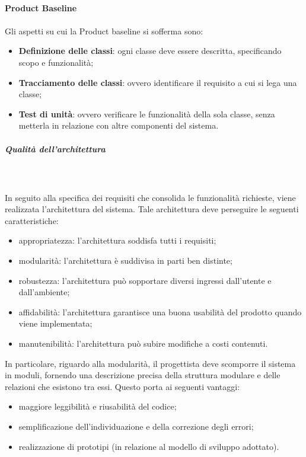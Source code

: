 			\mbox{} \\
			\textbf{Product Baseline} \mbox{} \\ \mbox{} \\
			Gli aspetti su cui la  Product baseline si sofferma sono:
				\begin{itemize}
					\item \textbf{Definizione delle classi}: ogni classe deve essere descritta, specificando scopo e funzionalità;
					\item \textbf{Tracciamento delle classi}: ovvero identificare il requisito a cui si lega una classe;
					\item \textbf{Test di unità}: ovvero verificare le funzionalità della sola classe, senza metterla in relazione con altre componenti del sistema.
				\end{itemize}
				\subparagraph{Qualità dell'architettura} \mbox{} \\ \mbox{} \\
				In seguito alla specifica dei requisiti che consolida le funzionalità richieste, viene realizzata l'architettura del sistema. Tale architettura deve perseguire le seguenti caratteristiche: \begin{itemize}
				\item appropriatezza: l'architettura soddisfa tutti i requisiti;
				\item modularità: l'architettura è suddivisa in parti ben distinte;
				\item robustezza: l'architettura può sopportare diversi ingressi dall'utente e dall'ambiente;
				\item affidabilità: l'architettura garantisce una buona usabilità del prodotto quando viene implementata;
				\item manutenibilità: l'architettura può subire modifiche a costi contenuti.
				\end{itemize}
				In particolare, riguardo alla modularità, il progettista deve scomporre il sistema in moduli, fornendo una descrizione precisa della struttura modulare e delle relazioni che esistono tra essi.
Questo porta ai seguenti vantaggi: \begin{itemize}
\item maggiore leggibilità e riusabilità del codice;
\item semplificazione dell'individuazione e della correzione degli errori;
\item realizzazione di prototipi (in relazione al modello di sviluppo adottato).
\end{itemize}
